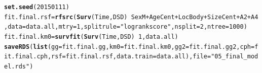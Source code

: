 \documentclass{article}\usepackage[]{graphicx}\usepackage[]{color}
\makeatletter
\newcommand{\hlnum}[1]{\textcolor[rgb]{0.686,0.059,0.569}{#1}}%
\newcommand{\hlstr}[1]{\textcolor[rgb]{0.192,0.494,0.8}{#1}}%
\newcommand{\hlopt}[1]{\textcolor[rgb]{0,0,0}{#1}}%
\newcommand{\hlstd}[1]{\textcolor[rgb]{0.345,0.345,0.345}{#1}}%
\newcommand{\hlkwb}[1]{\textcolor[rgb]{0.69,0.353,0.396}{#1}}%
\newcommand{\hlkwc}[1]{\textcolor[rgb]{0.333,0.667,0.333}{#1}}%
\newcommand{\hlkwd}[1]{\textcolor[rgb]{0.737,0.353,0.396}{\textbf{#1}}}%
\newenvironment{kframe}{%
 \def\at@end@of@kframe{}%
 \ifinner\ifhmode%
  \def\at@end@of@kframe{\end{minipage}}%
  \begin{minipage}{\columnwidth}%
 \fi\fi%
 \def\FrameCommand##1{\hskip\@totalleftmargin \hskip-\fboxsep
 \colorbox{shadecolor}{##1}\hskip-\fboxsep
     \hskip-\linewidth \hskip-\@totalleftmargin \hskip\columnwidth}%
 \MakeFramed {\advance\hsize-\width
   \@totalleftmargin\z@ \linewidth\hsize
   \@setminipage}}%
 {\par\unskip\endMakeFramed%
 \at@end@of@kframe}
\newenvironment{knitrout}{}{} %
\makeatother
\begin{document}
\begin{knitrout}
\begin{kframe}
\begin{alltt}
\hlkwd{set.seed}\hlstd{(}\hlnum{20150111}\hlstd{)}
\hlstd{fit.final.rsf} \hlkwb{=} \hlkwd{rfsrc}\hlstd{(}\hlkwd{Surv}\hlstd{(Time, DSD)} \hlopt{~} \hlstd{SexM} \hlopt{+} \hlstd{AgeCent} \hlopt{+} \hlstd{LocBody} \hlopt{+} \hlstd{SizeCent} \hlopt{+} \hlstd{A2} \hlopt{+} \hlstd{A4,} \hlkwc{data} \hlstd{= data.all,} \hlkwc{mtry} \hlstd{=} \hlnum{1}\hlstd{,} \hlkwc{splitrule} \hlstd{=} \hlstr{"logrankscore"}\hlstd{,} \hlkwc{nsplit} \hlstd{=} \hlnum{2}\hlstd{,} \hlkwc{ntree} \hlstd{=} \hlnum{1000}\hlstd{)}
\hlstd{fit.final.km0} \hlkwb{=} \hlkwd{survfit}\hlstd{(}\hlkwd{Surv}\hlstd{(Time, DSD)} \hlopt{~} \hlnum{1}\hlstd{, data.all)}
\hlkwd{saveRDS}\hlstd{(}\hlkwd{list}\hlstd{(}\hlkwc{gg} \hlstd{= fit.final.gg,} \hlkwc{km0} \hlstd{= fit.final.km0,} \hlkwc{gg2} \hlstd{= fit.final.gg2,} \hlkwc{cph} \hlstd{= fit.final.cph,} \hlkwc{rsf} \hlstd{= fit.final.rsf,} \hlkwc{data.train} \hlstd{= data.all),} \hlkwc{file} \hlstd{=} \hlstr{"05_final_model.rds"}\hlstd{)}
\end{alltt}
\end{kframe}
\end{knitrout}

\end{document}
